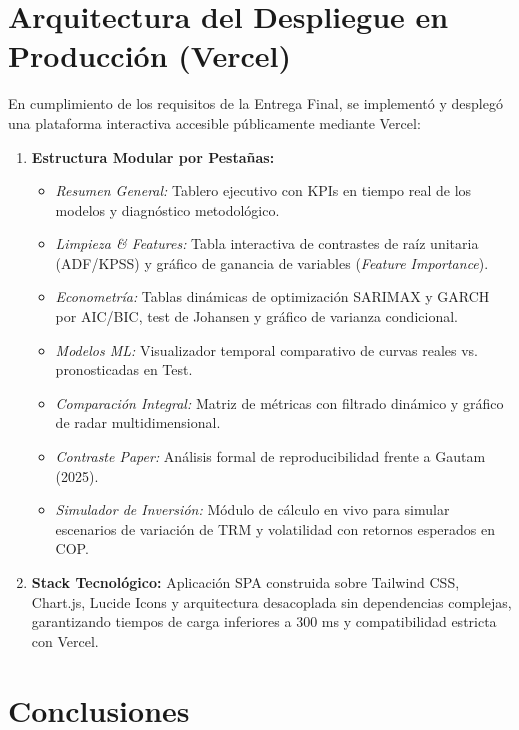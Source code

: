 \documentclass[12pt,letterpaper]{article}
\begin{document}
\section{Arquitectura del Despliegue en Producción (Vercel)}

En cumplimiento de los requisitos de la Entrega Final, se implementó y desplegó una plataforma interactiva accesible públicamente mediante Vercel:
\begin{enumerate}
    \item \textbf{Estructura Modular por Pestañas:}
    \begin{itemize}
        \item \textit{Resumen General:} Tablero ejecutivo con KPIs en tiempo real de los modelos y diagnóstico metodológico.
        \item \textit{Limpieza \& Features:} Tabla interactiva de contrastes de raíz unitaria (ADF/KPSS) y gráfico de ganancia de variables (\textit{Feature Importance}).
        \item \textit{Econometría:} Tablas dinámicas de optimización SARIMAX y GARCH por AIC/BIC, test de Johansen y gráfico de varianza condicional.
        \item \textit{Modelos ML:} Visualizador temporal comparativo de curvas reales vs. pronosticadas en Test.
        \item \textit{Comparación Integral:} Matriz de métricas con filtrado dinámico y gráfico de radar multidimensional.
        \item \textit{Contraste Paper:} Análisis formal de reproducibilidad frente a Gautam (2025).
        \item \textit{Simulador de Inversión:} Módulo de cálculo en vivo para simular escenarios de variación de TRM y volatilidad con retornos esperados en COP.
    \end{itemize}
    \item \textbf{Stack Tecnológico:} Aplicación SPA construida sobre Tailwind CSS, Chart.js, Lucide Icons y arquitectura desacoplada sin dependencias complejas, garantizando tiempos de carga inferiores a 300 ms y compatibilidad estricta con Vercel.
\end{enumerate}

\section{Conclusiones}
\end{document}
